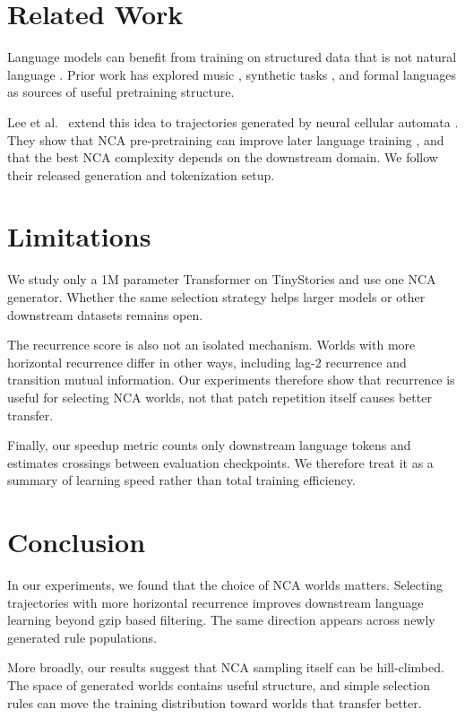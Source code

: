 \documentclass[10pt]{article}
\begin{document}
\section{Related Work}

Language models can benefit from training on structured data that is not natural language \citep{shinnick2025procedural}. Prior work has explored music \citep{papadimitriou2020music}, synthetic tasks \citep{wu2022insights}, and formal languages \citep{hu2025circuits} as sources of useful pretraining structure.

Lee et al.\ \citep{lee2026nca} extend this idea to trajectories generated by neural cellular automata \citep{mordvintsev2020growing}. They show that NCA pre-pretraining can improve later language training \citep{yamaguchi2026synthetic}, and that the best NCA complexity depends on the downstream domain. We follow their released generation and tokenization setup.

\section{Limitations}

We study only a 1M parameter Transformer on TinyStories and use one NCA generator. Whether the same selection strategy helps larger models or other downstream datasets remains open.

The recurrence score is also not an isolated mechanism. Worlds with more horizontal recurrence differ in other ways, including lag-2 recurrence and transition mutual information. Our experiments therefore show that recurrence is useful for selecting NCA worlds, not that patch repetition itself causes better transfer.

Finally, our speedup metric counts only downstream language tokens and estimates crossings between evaluation checkpoints. We therefore treat it as a summary of learning speed rather than total training efficiency.

\section{Conclusion}

In our experiments, we found that the choice of NCA worlds matters. Selecting trajectories with more horizontal recurrence improves downstream language learning beyond gzip based filtering. The same direction appears across newly generated rule populations.

More broadly, our results suggest that NCA sampling itself can be hill-climbed. The space of generated worlds contains useful structure, and simple selection rules can move the training distribution toward worlds that transfer better.


\renewcommand{\bibfont}{\small}

\end{document}
